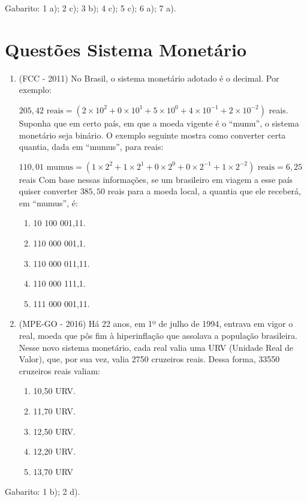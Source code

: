  Gabarito: 1 a); 2 c); 3 b); 4 c); 5 c); 6 a); 7 a).

 \section{Questões Sistema Monetário}

\begin{enumerate}[1)]
 \item (FCC - 2011) No Brasil, o sistema monetário adotado é o decimal. Por exemplo:

$205,42 \text{ reais} = (2 \times 10^2 + 0 \times 10^1 + 5 \times 10^0 + 4 \times 10^{-1} + 2 \times 10^{-2})$ reais. Suponha que em certo país, em que a moeda vigente é o “mumu”, o sistema monetário seja binário. O exemplo seguinte mostra como converter certa quantia, dada em “mumus”, para reais:

$110,01 \text{ mumus} = (1 \times 2^2 + 1 \times 2^1 + 0 \times 2^0 + 0 \times 2^{-1} + 1 \times 2^{-2}) \text{ reais} = 6,25$ reais Com base nessas informações, se um brasileiro em viagem a esse país quiser converter $385,50$ reais para a moeda local, a quantia que ele receberá, em “mumus”, é:

\begin{enumerate}
\item 10 100 001,11.
\item 110 000 001,1.
\item 110 000 011,11.
\item 110 000 111,1.
\item 111 000 001,11.
\end{enumerate}

\item (MPE-GO - 2016) Há 22 anos, em 1º de julho de 1994, entrava em vigor o real, moeda que pôs fim à hiperinflação que assolava a população brasileira. Nesse novo sistema monetário, cada real valia uma URV (Unidade Real de Valor), que, por sua vez, valia 2750 cruzeiros reais. Dessa forma, 33550 cruzeiros reais valiam:
\begin{enumerate}
\item 10,50 URV.
\item 11,70 URV.
\item 12,50 URV.
\item 12,20 URV.
\item 13,70 URV
\end{enumerate}

\end{enumerate}

Gabarito: 1 b); 2 d).

